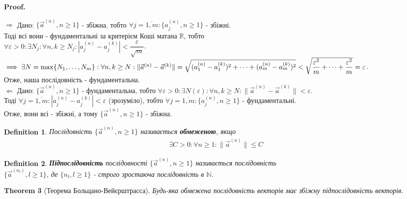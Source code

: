 \documentclass[a4paper, 10pt]{article}
\makeatletter
\def\qed{$\blacksquare$}
\def\rightproof{$\boxed{\Rightarrow}$ }
\def\leftproof{$\boxed{\Leftarrow}$ }
\theoremstyle{theoremdd}
\newtheorem{theorem}{Theorem}[subsection]
\theoremstyle{theoremdd}
\newtheorem{definition}[theorem]{Definition}
\theoremstyle{theoremdd}
\theoremstyle{theoremdd}
\theoremstyle{theoremdd}
\theoremstyle{theoremdd}
\theoremstyle{theoremdd}
\theoremstyle{theoremdd}
\renewenvironment{proof}[1][Proof.\\]{\par
\pushQED{\hfill \qed}%
\normalfont \topsep6\p@\@plus6\p@\relax
\trivlist
\item\relax
{\bfseries
#1\@addpunct{.}}\hspace\labelsep\ignorespaces
}{%
\popQED\endtrivlist\@endpefalse
}
\newcommand\Norm[1]{\lVert#1\rVert}
\makeatother
\begin{document}
\begin{proof}
\rightproof Дано: $\{\vec{a}^{(n)}, n \geq 1 \}$ - збіжна, тобто $\forall j = \overline{1,m}: \{a_j^{(n)}, n \geq 1\}$ - збіжні.\\
Тоді всі вони - фундаментальні за критерієм Коші матана $\mathbb{R}$, тобто \\ $\forall \varepsilon > 0: \exists N_j: \forall n,k \geq N_j: |a_j^{(n)} - a_j^{(k)}| < \dfrac{\varepsilon}{\sqrt{m}}$.\\
$\implies \exists N = \max\{N_1,\dots,N_m\}: \forall n,k \geq N: \\ \Norm{\vec{a}^{(n)} - \vec{a}^{(k)}} = \sqrt{(a_1^{(n)} - a_1^{(k)})^2 + \dots + (a_m^{(n)} - a_m^{(k)})^2} < \sqrt{\dfrac{\varepsilon^2}{m} + \dots + \dfrac{\varepsilon^2}{m}} = \varepsilon$.\\
Отже, наша послідовність - фундаментальна.
\bigskip \\
\leftproof Дано: $\{\vec{a}^{(n)}, n \geq 1 \}$ - фундаментальна, тобто $\forall \varepsilon > 0: \exists N(\varepsilon): \forall n, k \geq N: \Norm{\vec{a}^{(n)} - \vec{a}^{(k)}} < \varepsilon$.\\
Тоді $\forall j = \overline{1,m}: |a_j^{(n)} - a_j^{(k)}| < \varepsilon$ (зрозуміло), тобто $\forall j = \overline{1,m}: \{a_j^{(n)}, n \geq 1\}$ - фундаментальні.\\
Отже, вони всі - збіжні, а тому $\{\vec{a}^{(n)}, n \geq 1 \}$ - збіжна.
\end{proof}

\begin{definition}
Послідовність $\{\vec{a}^{(n)}, n \geq 1 \}$ називається \textbf{обмеженою}, якщо
\begin{align*}
\exists C > 0: \forall n \geq 1: \Norm{\vec{a}^{(n)}} \leq C
\end{align*}
\end{definition}

\begin{definition}
\textbf{Підпослідовність} послідовності $\{\vec{a}^{(n)}, n \geq 1 \}$ називається послідовність \\ $\{\vec{a}^{(n_l)}, l \geq 1 \}$, де $\{n_l, l \geq 1 \}$ - строго зростаюча послідовність в $\mathbb{N}$.
\end{definition}

\begin{theorem}[Теорема Больцано-Вейєрштрасса]
Будь-яка обмежена послідовність векторів має збіжну підпослідовність векторів.
\end{theorem}
\end{document}

